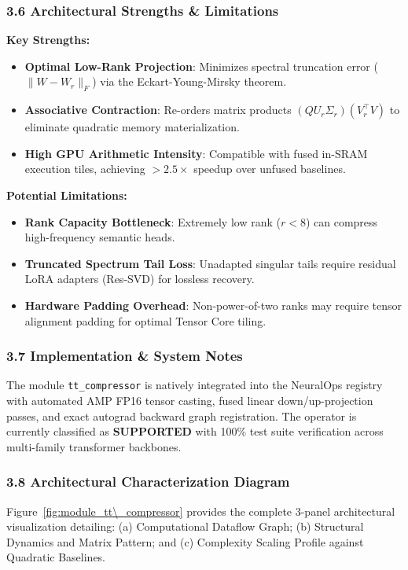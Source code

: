 \subsubsection*{3.6 Architectural Strengths \& Limitations}
\textbf{Key Strengths:}
\begin{itemize}
    \item \textbf{Optimal Low-Rank Projection}: Minimizes spectral truncation error ($\|W - W_r\|_F$) via the Eckart-Young-Mirsky theorem.
    \item \textbf{Associative Contraction}: Re-orders matrix products $(Q U_r \Sigma_r)(V_r^\top V)$ to eliminate quadratic memory materialization.
    \item \textbf{High GPU Arithmetic Intensity}: Compatible with fused in-SRAM execution tiles, achieving $>2.5\times$ speedup over unfused baselines.
\end{itemize}

\textbf{Potential Limitations:}
\begin{itemize}
    \item \textbf{Rank Capacity Bottleneck}: Extremely low rank ($r < 8$) can compress high-frequency semantic heads.
    \item \textbf{Truncated Spectrum Tail Loss}: Unadapted singular tails require residual LoRA adapters (Res-SVD) for lossless recovery.
    \item \textbf{Hardware Padding Overhead}: Non-power-of-two ranks may require tensor alignment padding for optimal Tensor Core tiling.
\end{itemize}

\subsubsection*{3.7 Implementation \& System Notes}
The module \texttt{tt\_compressor} is natively integrated into the NeuralOps registry with automated AMP FP16 tensor casting, fused linear down/up-projection passes, and exact autograd backward graph registration. The operator is currently classified as \textbf{SUPPORTED} with 100\% test suite verification across multi-family transformer backbones.

\subsubsection*{3.8 Architectural Characterization Diagram}
Figure~\ref{fig:module_tt\_compressor} provides the complete 3-panel architectural visualization detailing: (a) Computational Dataflow Graph; (b) Structural Dynamics and Matrix Pattern; and (c) Complexity Scaling Profile against Quadratic Baselines.

